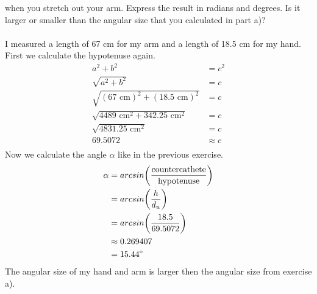when you stretch out your arm. Express the result in radians and degrees. Is it larger or smaller than the
angular size that you calculated in part a)?\\
\\
I measured a length of 67 cm for my arm and a length of 18.5 cm for my hand. First we calculate the
hypotenuse again.
\begin{equation*}
    \begin{split}
        a^2 + b^2 &= c^2\\
        \sqrt{a^2 + b^2} &= c\\
        \sqrt{(67 \text{ cm})^2 + (18.5 \text{ cm})^2} &= c\\
        \sqrt{4489 \text{ cm}^2 + 342.25 \text{ cm}^2} &= c\\
        \sqrt{4831.25 \text{ cm}^2} &= c\\
        69.5072 &\approx c\\
    \end{split}
\end{equation*}
Now we calculate the angle $\alpha$ like in the previous exercise.
\begin{equation*}
    \begin{split}
        \alpha &= arcsin \biggl(\frac{\text{countercathete}}{\text{hypotenuse}}\biggr)\\
        &= arcsin \biggl(\frac{h}{d_u}\biggr)\\
        &= arcsin \biggl(\frac{18.5}{69.5072}\biggr)\\
        &\approx 0.269407\\
        &= 15.44 \degree\\
    \end{split}
\end{equation*}
The angular size of my hand and arm is larger then the angular size from exercise a).
